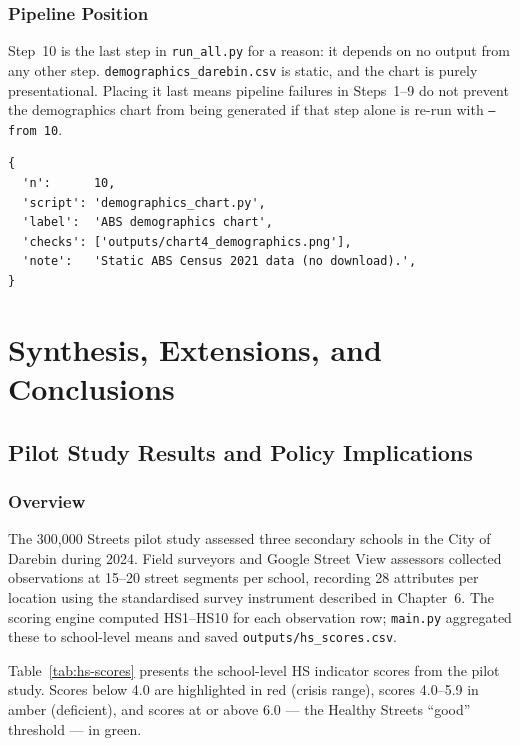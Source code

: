 \documentclass[11pt,a4paper,openany]{book}
\begin{document}
\section{Pipeline Position}

Step~10 is the last step in \texttt{run\_all.py} for a reason: it depends on no output
from any other step.  \texttt{demographics\_darebin.csv} is static, and the chart is
purely presentational.  Placing it last means pipeline failures in Steps~1--9 do not
prevent the demographics chart from being generated if that step alone is re-run with
\texttt{--from 10}.

\begin{lstlisting}[style=text, caption={Step 10 in run\_all.py STEPS list.}]
{
  'n':      10,
  'script': 'demographics_chart.py',
  'label':  'ABS demographics chart',
  'checks': ['outputs/chart4_demographics.png'],
  'note':   'Static ABS Census 2021 data (no download).',
}
\end{lstlisting}

\part{Synthesis, Extensions, and Conclusions}

\chapter{Pilot Study Results and Policy Implications}

\section{Overview}

The 300,000 Streets pilot study assessed three secondary schools in the City of Darebin
during 2024.  Field surveyors and Google Street View assessors collected observations at
15--20 street segments per school, recording 28 attributes per location using the
standardised survey instrument described in Chapter~6.  The scoring engine computed
HS1--HS10 for each observation row; \texttt{main.py} aggregated these to school-level
means and saved \texttt{outputs/hs\_scores.csv}.

Table~\ref{tab:hs-scores} presents the school-level HS indicator scores from the pilot
study.  Scores below 4.0 are highlighted in red (crisis range), scores 4.0--5.9 in
amber (deficient), and scores at or above 6.0 --- the Healthy Streets ``good''
threshold --- in green.
\end{document}
